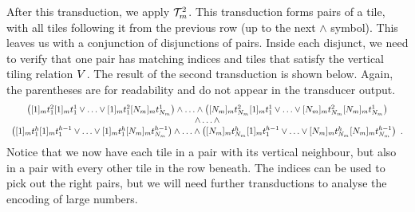 After this transduction, we apply $\mathcal{T}^2_m$. This
transduction forms pairs of a tile, with all tiles following it from the
previous row (up to the next $\land$ symbol). This leaves us with a
conjunction of disjunctions of pairs. Inside each disjunct, we need to
verify that one pair has matching indices and tiles that satisfy the
vertical tiling relation $V$. The result of the second transduction
is shown below.  Again, the parentheses are for readability and do not
appear in the transducer output.
\[
    \begin{array}{c}
        \left(
            [1]_{m} t^2_1
            [1]_{m} t^1_1
            \lor
            \ldots
            \lor
            [1]_{m} t^2_1
            [N_{m}]_{m} t^1_{N_{m}}
        \right)
            \land
            \ldots
            \land
            \left(
                [N_{m}]_{m} t^2_{N_{m}}
                [1]_{m} t^1_1
                \lor
                \ldots
                \lor
                [N_{m}]_{m} t^2_{N_{m}}
                [N_{m}]_{m} t^1_{N_{m}}
            \right) \\
        \land \ldots \land \\
        \left(
            [1]_{m} t^h_1
            [1]_{m} t^{h-1}_1
            \lor
            \ldots
            \lor
            [1]_{m} t^h_1
            [N_{m}]_{m}
                t^{h-1}_{N_{m}}
        \right)
            \land
            \ldots
            \land
            \left(
                [N_{m}]_{m}
                    t^h_{N_{m}}
                [1]_{m} t^{h-1}_1
                \lor
                \ldots
                \lor
                [N_{m}]_{m}
                    t^h_{N_{m}}
                [N_{m}]_{m}
                    t^{h-1}_{N_{m}}
            \right) \ .\\
    \end{array}
\]
Notice that we now have each tile in a pair with its vertical neighbour,
but also in a pair with every other tile in the row beneath. The indices
can be used to pick out the right pairs, but we will need further
transductions to analyse the encoding of large numbers.

